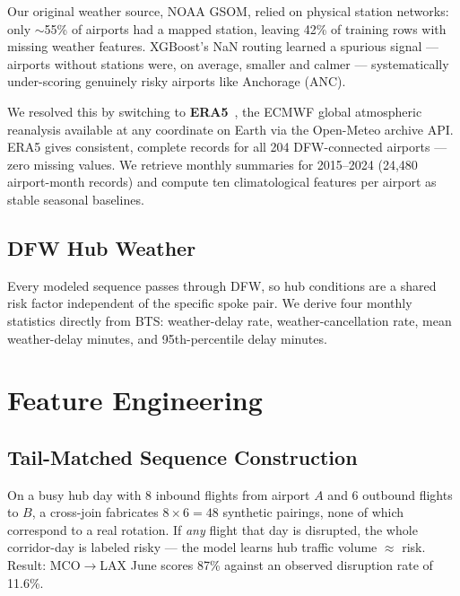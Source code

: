 \documentclass[11pt, twoside]{article}
\begin{document}
Our original weather source, NOAA GSOM, relied on physical station networks:
only $\sim$55\% of airports had a mapped station, leaving 42\% of training
rows with missing weather features.  XGBoost's NaN routing learned a spurious
signal --- airports without stations were, on average, smaller and calmer ---
systematically under-scoring genuinely risky airports like Anchorage (ANC).

We resolved this by switching to \textbf{ERA5}~\cite{hersbach2020era5}, the
ECMWF global atmospheric reanalysis available at any coordinate on Earth via
the Open-Meteo archive API.  ERA5 gives consistent, complete records for all
204 DFW-connected airports --- zero missing values.  We retrieve monthly
summaries for 2015--2024 (24,480 airport-month records) and compute ten
climatological features per airport as stable seasonal baselines.

\subsection{DFW Hub Weather}

Every modeled sequence passes through DFW, so hub conditions are a shared
risk factor independent of the specific spoke pair.  We derive four monthly
statistics directly from BTS: weather-delay rate, weather-cancellation rate,
mean weather-delay minutes, and 95th-percentile delay minutes.

\section{Feature Engineering}
\label{sec:features}

\subsection{Tail-Matched Sequence Construction}
\label{sec:tailmatch}

\begin{keybox}[title=Why Corridor-Day Cross-Joining is Flawed]
On a busy hub day with 8 inbound flights from airport $A$ and 6 outbound
flights to $B$, a cross-join fabricates $8 \times 6 = 48$ synthetic pairings,
none of which correspond to a real rotation.  If \emph{any} flight that day is
disrupted, the whole corridor-day is labeled risky --- the model learns hub
traffic volume $\approx$ risk.  Result: MCO$\to$LAX June scores 87\% against
an observed disruption rate of 11.6\%.
\end{keybox}
\end{document}
